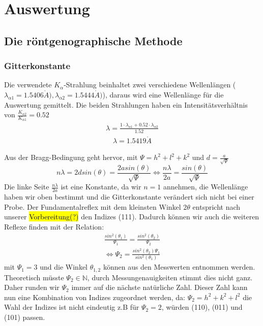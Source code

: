 \section{Auswertung}
    \subsection{Die röntgenographische Methode}
        \subsubsection{Gitterkonstante}
            Die verwendete $K_{\alpha}$-Strahlung beinhaltet zwei verschiedene Wellenlängen ($\lambda_{\alpha 1} = 1.5406 \mathring{A}), \lambda_{\alpha 2} = 1.5444 \mathring{A})$),
            daraus wird eine Wellenlänge
            für die Auswertung gemittelt. Die beiden Strahlungen haben ein Intensitätsverhältnis von $\frac{K_{\alpha 2}}{K_{\alpha 1}} = 0.52$
            \begin{align}
                \lambda = \frac{1 \cdot \lambda_{\alpha 1} + 0.52 \cdot \lambda_{\alpha 2}}{1.52}
            \end{align}
            \begin{align*}
                \lambda = 1.5419 \mathring{A}
            \end{align*}

            Aus der Bragg-Bedingung geht hervor, mit $\Psi =  h^2 + l^2 + k^2$ und $d = \frac{a}{\sqrt{\Psi}}$
            \begin{equation}
                n \lambda = 2dsin(\theta) = \frac{2asin(\theta)}{\sqrt{\Psi}} \Leftrightarrow \frac{n \lambda}{2a} = \frac{sin(\theta)}{\sqrt{\Psi}}
            \end{equation}
            Die linke Seite $\frac{n \lambda}{2a}$ ist eine Konstante, da wir $n=1$ annehmen, die Wellenlänge haben wir oben 
            bestimmt und die Gitterkonstante verändert sich nicht bei einer Probe. Der Fundamentalreflex mit dem kleinsten Winkel
            $2\theta$ entspricht nach unserer \hl{Vorbereitung(?)} den Indizes (111). Dadurch können wir auch die 
            weiteren Reflexe finden mit der Relation:
            \begin{align}
                \frac{sin^2(\theta_1)}{\Psi_1} = \frac{sin^2(\theta_2)}{\Psi_2} \\
                \Leftrightarrow \Psi_2 = \frac{sin^2(\theta_2)\Psi_1}{sin^2(\theta_1)}
            \end{align}
            mit $\Psi_1 = 3$ und die Winkel $\theta_{1,2}$ können aus den Messwerten entnommen werden. Theoretisch
            müsste $\Psi_2 \in \mathbb{N}$, durch Messungenauigkeiten stimmt dies nicht ganz. Daher runden wir $\Psi_2$ immer auf die 
            nächste natürliche Zahl. Dieser Zahl kann nun eine Kombination von Indizes zugeordnet werden, da:
            $\Psi_2 = h^2+k^2+l^2$ die Wahl der Indizes ist nicht eindeutig z.B für $\Psi_2 = 2$, würden (110), (011) und (101) passen.
            
